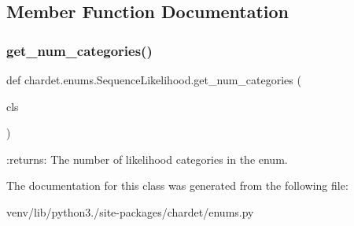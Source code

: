 \subsection{Member Function Documentation}
\mbox{\label{classchardet_1_1enums_1_1_sequence_likelihood_a3a2d2ab17630bed657e7886e53869623}} 
\subsubsection{\texorpdfstring{get\+\_\+num\+\_\+categories()}{get\_num\_categories()}}
{\footnotesize\ttfamily def chardet.\+enums.\+Sequence\+Likelihood.\+get\+\_\+num\+\_\+categories (\begin{DoxyParamCaption}\item[{}]{cls }\end{DoxyParamCaption})}

\begin{DoxyVerb}:returns: The number of likelihood categories in the enum.\end{DoxyVerb}
 

The documentation for this class was generated from the following file\+:\begin{DoxyCompactItemize}
\item 
venv/lib/python3./site-\/packages/chardet/enums.\+py\end{DoxyCompactItemize}

